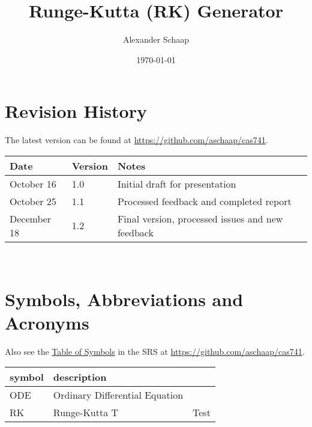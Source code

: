 \documentclass[12pt, titlepage]{article}
\begin{document}
\title{Runge-Kutta (RK) Generator} 
\author{Alexander Schaap}
\date{\today}
	
\maketitle


\section{Revision History}
The latest version can be found at \url{https://github.com/aschaap/cas741}.\\

\noindent
\begin{tabularx}{\textwidth}{p{3cm}p{2cm}X}
\toprule {\bf Date} & {\bf Version} & {\bf Notes}\\
\midrule
October 16 & 1.0 & Initial draft for presentation\\
October 25 & 1.1 & Processed feedback and completed report\\
December 18 & 1.2 & Final version, processed issues and new feedback\\
\bottomrule
\end{tabularx}

~\newpage

\section{Symbols, Abbreviations and Acronyms}
Also see the \href{../SRS/CA.pdf#ssec:symbols}{Table of Symbols} in the SRS at 
\url{https://github.com/aschaap/cas741}.\\

\noindent
\renewcommand{\arraystretch}{1.2}
\begin{tabular}{l l} 
  \toprule		
  \textbf{symbol} & \textbf{description}\\
  \midrule 
  ODE & Ordinary Differential Equation\\
  RK & Runge-Kutta
  T & Test\\
  \bottomrule
\end{tabular}\\


\newpage

\tableofcontents

\end{document}
